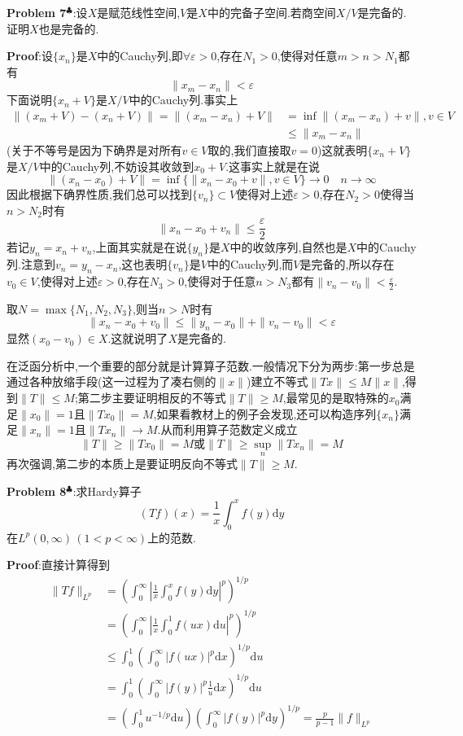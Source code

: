 \textbf{Problem 7}$^\clubsuit $:设$X$是赋范线性空间,$V$是$X$中的完备子空间.若商空间$X/V$是完备的.证明$X$也是完备的.\par
\textbf{Proof}:设$\{x_n\}$是$X$中的Cauchy列,即$\forall \varepsilon>0$,存在$N_1>0$,使得对任意$m>n>N_1$都有
$$
\|x_m-x_n\|<\varepsilon
$$
下面说明$\{x_n+V\}$是$X/V$中的Cauchy列.事实上
$$
\begin{aligned}
    \|(x_m+V)-(x_n+V)\|=\|(x_m-x_n)+V\| &=\inf{\|(x_m-x_n)+v\|,v\in V}\\
                                        &\leqslant \|x_m-x_n\| 
\end{aligned}
$$
(关于不等号是因为下确界是对所有$v\in V$取的,我们直接取$v=0$)这就表明$\{x_n+V\}$是$X/V$中的Cauchy列,不妨设其收敛到$x_0+V$.这事实上就是在说
$$
\|(x_n-x_0)+V\|=\inf\{\|x_n-x_0+v\|,v\in V\}\to 0\quad n\to \infty
$$
因此根据下确界性质,我们总可以找到$\{v_n\}\subset V$使得对上述$\varepsilon>0$,存在$N_2>0$使得当$n>N_2$时有
$$
\|x_n-x_0+v_n\|\leqslant \frac{\varepsilon}{2}
$$
若记$y_n=x_n+v_n$,上面其实就是在说$\{y_n\}$是$X$中的收敛序列,自然也是$X$中的Cauchy列.注意到$v_n=y_n-x_n$,这也表明$\{v_n\}$是$V$中的Cauchy列,而$V$是完备的,所以存在$v_0\in V$,使得对上述$\varepsilon>0$,存在$N_3>0$,使得对于任意$n>N_3$都有$\|v_n-v_0\|<\frac{\varepsilon}{2}$.\par
取$N=\max\{N_1,N_2,N_3\}$,则当$n>N$时有
$$
\|x_n-x_0+v_0\|\leqslant \|y_n-x_0\|+\|v_n-v_0\|<\varepsilon
$$
显然$(x_0-v_0)\in X$.这就说明了$X$是完备的.\par
在泛函分析中,一个重要的部分就是计算算子范数.一般情况下分为两步:第一步总是通过各种放缩手段(这一过程为了凑右侧的$\|x\|$)建立不等式$\|Tx\|\leqslant M\|x\|$,得到$\|T\|\leqslant M$;第二步主要证明相反的不等式$\|T\|\geqslant M$,最常见的是取特殊的$x_0$满足$\|x_0\|=1$且$\|Tx_0\|=M$,如果看教材上的例子会发现,还可以构造序列$\{x_n\}$满足$\|x_n\|=1$且$\|Tx_n\|\to M$.从而利用算子范数定义成立
$$
\|T\|\geqslant \|Tx_0\|=M\text{或}\|T\|\geqslant \sup_{n}\|Tx_n\|=M
$$
再次强调,第二步的本质上是要证明反向不等式$\|T\|\geqslant M$.\par
\textbf{Problem 8}$^\clubsuit $:求Hardy算子
$$
(Tf)(x)=\frac{1}{x}\int_0^x f(y)\mathrm{d}y
$$
在$L^p(0,\infty)\,(1<p<\infty)$上的范数.\par
\textbf{Proof}:直接计算得到
$$
\begin{aligned}
    \|Tf\|_{L^p} &= \left(\int_0^\infty\left|\frac{1}{x}\int_0^x f(y)\mathrm{d}y\right|^p\right)^{1/p}\\
                 &= \left(\int_0^\infty\left|\frac{1}{x}\int_0^1 f(ux)\mathrm{d}u\right|^p\right)^{1/p}\\
                 &\leqslant \int_0^1\left(\int_0^\infty |f(ux)|^p\mathrm{d}x\right)^{1/p}\mathrm{d}u\\
                 &= \int_0^1\left(\int_0^\infty |f(y)|^p\frac{1}{u}\mathrm{d}x\right)^{1/p}\mathrm{d}u\\
                 &= \left(\int_0^1u^{-1/p}\mathrm{d}u\right)\left(\int_0^\infty|f(y)|^p\mathrm{d}y\right)^{1/p}=\frac{p}{p-1}\|f\|_{L^p}
\end{aligned}
$$
